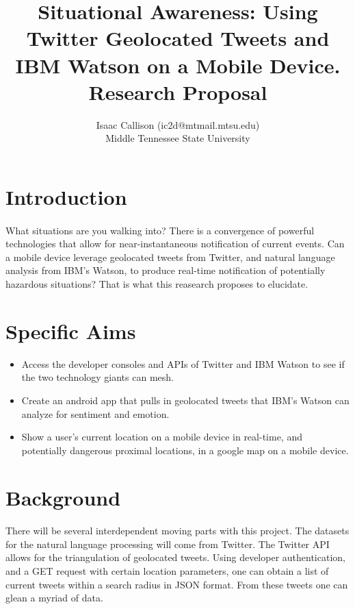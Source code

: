 \documentclass[12pt, oneside]{article}
\title{Situational Awareness: Using Twitter Geolocated Tweets and IBM Watson on a Mobile Device.
\\\medskip Research Proposal}
\author{Isaac Callison (ic2d@mtmail.mtsu.edu)\\Middle Tennessee State University}
\begin{document}
\maketitle
\nocite{*}
\newpage{}

\section{Introduction}
\paragraph{}
What situations are you walking into? There is a convergence of powerful
technologies that allow for near-instantaneous notification of current events.
Can a mobile device leverage geolocated tweets from Twitter, and natural language analysis from
IBM's Watson, to produce real-time notification of potentially hazardous
situations? That is what this reasearch proposes to elucidate.

\section{Specific Aims}
\begin{itemize}
 \item Access the developer consoles and APIs of Twitter and IBM Watson to see
 if the two technology giants can mesh.

 \item Create an android app that pulls in geolocated tweets that IBM's Watson
 can analyze for sentiment and emotion.

 \item Show a user's current location on a mobile device in real-time, and potentially dangerous proximal locations, in a google map on a mobile device.

\end{itemize}

\section{Background}
\paragraph{}
There will be several interdependent moving parts with this project. The datasets for the natural language processing will come from Twitter. The
Twitter API allows for the triangulation of geolocated tweets\cite{TwitterGeo}.
Using developer authentication, and a GET request with certain location parameters, one can obtain a list of current tweets within a search radius in JSON format. From these tweets one can glean a myriad of data.
\end{document}
